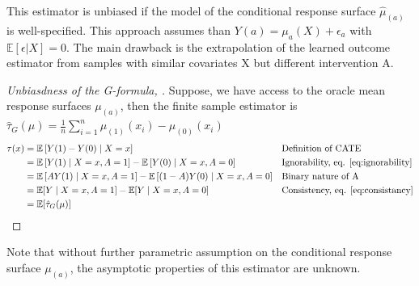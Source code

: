 \documentclass[french,12pt,twoside,a4paper]{book}
\newtheorem{proof}{Proof}
\begin{document}
\begin{appendices}
\begin{background_box_left}
    This estimator is unbiased if the model of the conditional response surface
    $\hat \mu_{(a)}$ is well-specified. This approach assumes than $Y(a) =
      \mu_a(X) + \epsilon_a$ with $\mathbb E[\epsilon|X] = 0$. The main drawback is
    the extrapolation of the learned outcome estimator from samples with similar
    covariates X but different intervention A.

    \begin{proof}[Unbiasdness of the G-formula, \citep{robins_role_1986}]
      Suppose, we have access to the oracle mean response surfaces $\mu_{(a)}$,
      then the finite sample estimator is $\hat{\tau}_G(\mu) = \frac{1}{n}
        \sum_{i=1}^n  \mu_{(1)}(x_i) -  \mu_{(0)}(x_i)$
      \begin{align*}
        \tau(x) & =\mathbb{E}\left[Y(1)-Y(0) \mid X=x\right]                                                   &  & \text{Definition of CATE}                      \\
                & =\mathbb{E}\left[Y(1) \mid X=x, A=1\right]-\mathbb{E}\left[Y(0) \mid X=x, A=0\right]         &  & \text{Ignorability, eq. \ref{eq:ignorability}} \\
                & =\mathbb{E}\left[A Y(1) \mid X=x, A=1\right]-\mathbb{E}\left[(1-A) Y(0) \mid X=x, A=0\right] &  & \text{Binary nature of A}                      \\
                & =\mathbb{E}[Y \mid X=x, A=1]-\mathbb{E}[Y \mid X=x, A=0]                                     &  & \text{Consistency, eq. \ref{eq:consistancy}}   \\
                & =\mathbb{E}[\hat{\tau}_G(\mu)]                                                               &  &
      \end{align*}
    \end{proof}

    Note that without further parametric assumption on the conditional response
    surface $\mu_{(a)}$, the asymptotic properties of this estimator are unknown.


\end{background_box_left}
\end{appendices}
\end{document}
